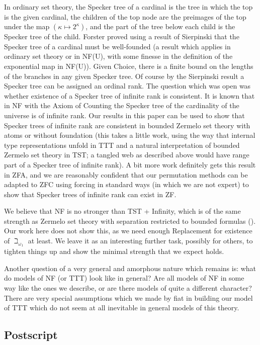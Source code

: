 \documentclass[112pt]{article}
\begin{document}
In ordinary set theory, the Specker tree of a cardinal is the tree in which the top is the given cardinal, the children of the top node  are the preimages of the top under the map $(\kappa \mapsto 2^{\kappa})$, and the part of the tree
below each child is the Specker tree of the child.  Forster proved using a result of Sierpinski that the Specker tree of a cardinal must be well-founded (a result which applies in ordinary set theory or in NF(U), with some finesse in the definition of the exponential map in NF(U)).  Given Choice, there is a finite bound on the lengths of the branches in any given Specker tree.  Of course by the Sierpinski result a Specker tree can be assigned an ordinal rank.  The question which was open
was whether existence of a Specker tree of infinite rank is consistent.  It is known that in NF with the Axiom of Counting the Specker tree of the cardinality of the universe is of infinite rank.  Our results in this paper can be used to show that Specker trees of infinite rank are consistent in bounded Zermelo set theory with atoms or without foundation (this takes a little work, using the way that internal type representations unfold in TTT and a natural interpretation of bounded Zermelo set theory in TST;  a tangled web as described above would have range part of a Specker tree of infinite rank).  A bit more work definitely gets this result in ZFA, and we are reasonably confident that our permutation methods can be adapted to ZFC using forcing in standard ways (in which we are not expert) to show that Specker trees of infinite rank can exist in ZF.

We believe that NF is no stronger than TST + Infinity, which is of the same strength as Zermelo set theory with separation restricted to bounded formulas (\cite{kemeny}).  Our work here does not show this, as we need enough Replacement for
existence of $\beth_{\omega_1}$ at least.  We leave it as an interesting further task, possibly for others, to tighten things up and show the minimal strength that we expect holds.

Another question of a very general and amorphous nature which remains is:  what do models of NF (or TTT) look like in general?  Are all models of NF in some way like the ones we describe, or are there models of quite a different character?  There are very special assumptions which we made by fiat in building our model of TTT which do  not seem at all inevitable in general models of this theory.

\subsection{Postscript}
\end{document}
